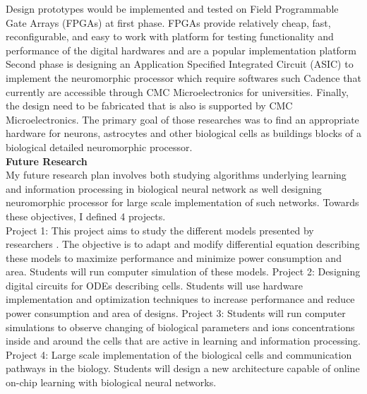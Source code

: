 \documentclass[12pt,oneside]{book}
\begin{document}
%
Design prototypes would be implemented and tested on Field Programmable Gate Arrays (FPGAs) at first phase. FPGAs provide relatively cheap, fast, reconfigurable, and easy to work with platform for testing functionality and performance of the digital hardwares and are a popular implementation platform
  Second phase is designing an Application Specified Integrated Circuit (ASIC)  to implement the neuromorphic processor which require softwares such Cadence that currently are accessible   through CMC Microelectronics for universities. Finally, the design need to be fabricated that is also is supported by CMC Microelectronics.
  The primary goal of those researches was to find an appropriate hardware for neurons, astrocytes and other biological cells as buildings blocks of a biological detailed neuromorphic processor.\\
{\bf Future Research  }\\
My future research plan involves both studying  algorithms underlying learning and information processing in biological neural network as well designing neuromorphic processor for large scale implementation of such networks. Towards these objectives, I defined 4 projects. \\ 
{ Project 1:} 
This project aims  to study the different models presented by researchers . The objective is to adapt and modify differential equation describing these models to maximize performance and minimize power consumption and area. Students will run computer simulation of these models.
{ Project 2:} Designing digital circuits for ODEs describing cells. Students will use hardware implementation and optimization techniques to increase performance and reduce power consumption and area of  designs. 
{ Project 3:} 
Students will run computer simulations to observe changing of biological parameters and ions concentrations inside and around the cells that are active in learning and information processing.   
{ Project 4:} 
Large scale implementation of the biological cells and   communication pathways in the biology. Students will design a new architecture capable of online on-chip learning with  biological neural networks. 
\end{document}
